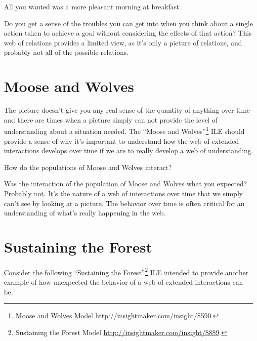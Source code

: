 \documentclass[]{memoir}
\begin{document}
\FloatBarrier 

\begin{model}[frametitle={Model: Bird Feeder Dilemma}] 

 All you wanted was a more pleasant morning at breakfast.




 \end{model}

Do you get a sense of the troubles you can get into when you think about
a single action taken to achieve a goal without considering the effects
of that action? This web of relations provides a limited view, as it's
only a picture of relations, and probably not all of the possible
relations.

\section{Moose and Wolves}

The picture doesn't give you any real sense of the quantity of anything
over time and there are times when a picture simply can not provide the
level of understanding about a situation needed. The ``Moose and
Wolves''\footnote{Moose and Wolves Model
  \url{http://insightmaker.com/insight/8590}.} ILE should provide a
sense of why it's important to understand how the web of extended
interactions develops over time if we are to really develop a web of
understanding.

\FloatBarrier 

\begin{model}[frametitle={Model: Moose and Wolves}] 

 How do the populations of Moose and Wolves interact?




 \end{model}

Was the interaction of the population of Moose and Wolves what you
expected? Probably not. It's the nature of a web of interactions over
time that we simply can't see by looking at a picture. The behavior over
time is often critical for an understanding of what's really happening
in the web.

\section{Sustaining the Forest}

Consider the following ``Sustaining the Forest''\footnote{Sustaining the
  Forest Model \url{http://insightmaker.com/insight/8889}.} ILE intended
to provide another example of how unexpected the behavior of a web of
extended interactions can be.
\end{document}
